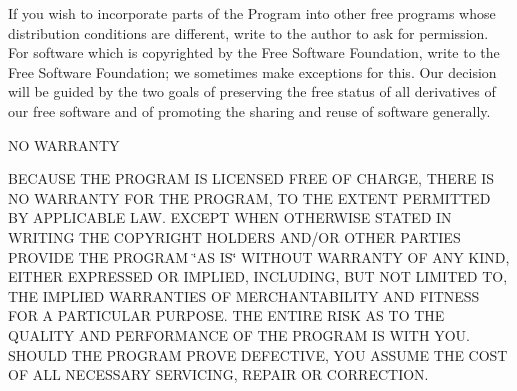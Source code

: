\begin{DoxyEnumerate}
\item If you wish to incorporate parts of the Program into other free programs whose distribution conditions are different, write to the author to ask for permission. For software which is copyrighted by the Free Software Foundation, write to the Free Software Foundation; we sometimes make exceptions for this. Our decision will be guided by the two goals of preserving the free status of all derivatives of our free software and of promoting the sharing and reuse of software generally. \begin{DoxyVerb}                        NO WARRANTY
\end{DoxyVerb}

\item B\-E\-C\-A\-U\-S\-E T\-H\-E P\-R\-O\-G\-R\-A\-M I\-S L\-I\-C\-E\-N\-S\-E\-D F\-R\-E\-E O\-F C\-H\-A\-R\-G\-E, T\-H\-E\-R\-E I\-S N\-O W\-A\-R\-R\-A\-N\-T\-Y F\-O\-R T\-H\-E P\-R\-O\-G\-R\-A\-M, T\-O T\-H\-E E\-X\-T\-E\-N\-T P\-E\-R\-M\-I\-T\-T\-E\-D B\-Y A\-P\-P\-L\-I\-C\-A\-B\-L\-E L\-A\-W. E\-X\-C\-E\-P\-T W\-H\-E\-N O\-T\-H\-E\-R\-W\-I\-S\-E S\-T\-A\-T\-E\-D I\-N W\-R\-I\-T\-I\-N\-G T\-H\-E C\-O\-P\-Y\-R\-I\-G\-H\-T H\-O\-L\-D\-E\-R\-S A\-N\-D/\-O\-R O\-T\-H\-E\-R P\-A\-R\-T\-I\-E\-S P\-R\-O\-V\-I\-D\-E T\-H\-E P\-R\-O\-G\-R\-A\-M \char`\"{}\-A\-S I\-S\char`\"{} W\-I\-T\-H\-O\-U\-T W\-A\-R\-R\-A\-N\-T\-Y O\-F A\-N\-Y K\-I\-N\-D, E\-I\-T\-H\-E\-R E\-X\-P\-R\-E\-S\-S\-E\-D O\-R I\-M\-P\-L\-I\-E\-D, I\-N\-C\-L\-U\-D\-I\-N\-G, B\-U\-T N\-O\-T L\-I\-M\-I\-T\-E\-D T\-O, T\-H\-E I\-M\-P\-L\-I\-E\-D W\-A\-R\-R\-A\-N\-T\-I\-E\-S O\-F M\-E\-R\-C\-H\-A\-N\-T\-A\-B\-I\-L\-I\-T\-Y A\-N\-D F\-I\-T\-N\-E\-S\-S F\-O\-R A P\-A\-R\-T\-I\-C\-U\-L\-A\-R P\-U\-R\-P\-O\-S\-E. T\-H\-E E\-N\-T\-I\-R\-E R\-I\-S\-K A\-S T\-O T\-H\-E Q\-U\-A\-L\-I\-T\-Y A\-N\-D P\-E\-R\-F\-O\-R\-M\-A\-N\-C\-E O\-F T\-H\-E P\-R\-O\-G\-R\-A\-M I\-S W\-I\-T\-H Y\-O\-U. S\-H\-O\-U\-L\-D T\-H\-E P\-R\-O\-G\-R\-A\-M P\-R\-O\-V\-E D\-E\-F\-E\-C\-T\-I\-V\-E, Y\-O\-U A\-S\-S\-U\-M\-E T\-H\-E C\-O\-S\-T O\-F A\-L\-L N\-E\-C\-E\-S\-S\-A\-R\-Y S\-E\-R\-V\-I\-C\-I\-N\-G, R\-E\-P\-A\-I\-R O\-R C\-O\-R\-R\-E\-C\-T\-I\-O\-N.

\end{DoxyEnumerate}
